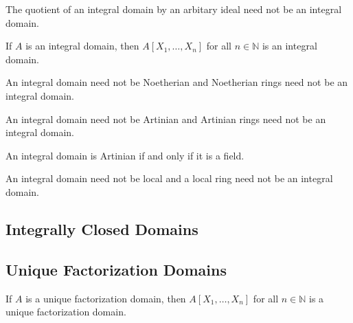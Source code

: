 \begin{exmbox}
    \begin{example}
        The quotient of an integral domain by an arbitary ideal need not be an integral domain.
    \end{example}
\end{exmbox}

\begin{thmbox}
    \begin{proposition}
        If \(A\) is an integral domain, then \(A[X_1, \ldots, X_n]\) for all \(n \in \mathbb{N}\) is an integral domain.
    \end{proposition}
\end{thmbox}

\begin{exmbox}
    \begin{example}
        An integral domain need not be Noetherian and Noetherian rings need not be an integral domain.
    \end{example}
\end{exmbox}

\begin{exmbox}
    \begin{example}
        An integral domain need not be Artinian and Artinian rings need not be an integral domain.
    \end{example}
\end{exmbox}

\begin{thmbox}
    \begin{proposition}
        An integral domain is Artinian if and only if it is a field.
    \end{proposition}
\end{thmbox}

\begin{exmbox}
    \begin{example}
        An integral domain need not be local and a local ring need not be an integral domain.
    \end{example}
\end{exmbox}

\subsection{Integrally Closed Domains}

\subsection{Unique Factorization Domains}

\begin{thmbox}
    \begin{proposition}
        If \(A\) is a unique factorization domain, then \(A[X_1, \ldots, X_n]\) for all \(n \in \mathbb{N}\) is a unique factorization domain.
    \end{proposition}
\end{thmbox}